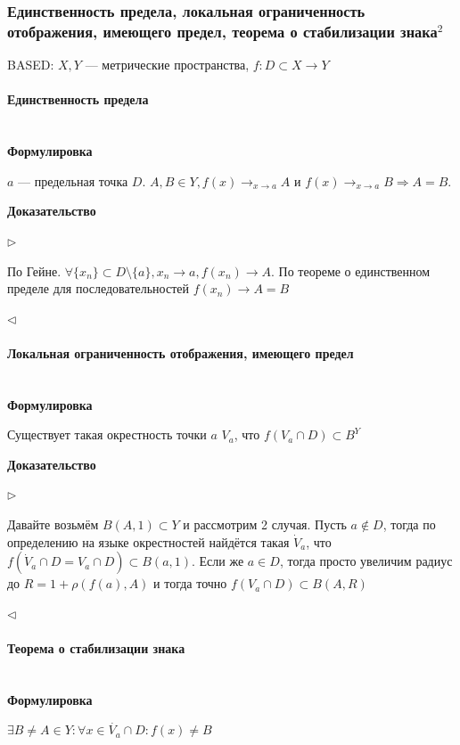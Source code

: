 \documentclass{article}
\def\dbl{\,\,}
\let\vanillaparagraph\paragraph
\renewcommand{\paragraph}[1]{\vanillaparagraph{#1}\mbox{}\\}
\begin{document}
\subsubsection{Единственность предела, локальная ограниченность отображения, имеющего предел, теорема о стабилизации знака\texorpdfstring{$^2$}{}}

\textsc{BASED:} $X, Y$ --- метрические пространства, $f: D \subset X \rightarrow Y$

\paragraph{Единственность предела}
\textbf{Формулировка}

$a$ --- предельная точка $D$. $A, B \in Y, f(x) \rightarrow_{x \rightarrow a} A$ и $f(x) \rightarrow_{x \rightarrow a} B \Rightarrow A = B$.

\textbf{Доказательство}

$\rhd$

По Гейне. $\forall \{x_n\} \subset D \setminus \{a\}, x_n \rightarrow a, f(x_n) \rightarrow A$. По теореме о единственном пределе для последовательностей $f(x_n) \rightarrow A = B$

$\lhd$

\paragraph{Локальная ограниченность отображения, имеющего предел}
\textbf{Формулировка}

Существует такая окрестность точки $a \dbl V_a$, что $f(V_a \cap D) \subset B^Y$

\textbf{Доказательство}

$\rhd$

Давайте возьмём $B(A, 1) \subset Y$ и рассмотрим 2 случая. Пусть $a \notin D$, тогда по определению на языке окрестностей найдётся такая $\dot{V}_a$, что $f(\dot{V}_a \cap D = V_a \cap D) \subset B(a, 1)$. Если же $a \in D$, тогда просто увеличим радиус до $R = 1 + \rho(f(a), A)$ и тогда точно $f(V_a \cap D) \subset B(A, R)$ 

$\lhd$

\paragraph{Теорема о стабилизации знака}
\textbf{Формулировка}

$\exists B \neq A \in Y: \forall x \in \dot{V_a} \cap D : f(x) \neq B$
\end{document}
